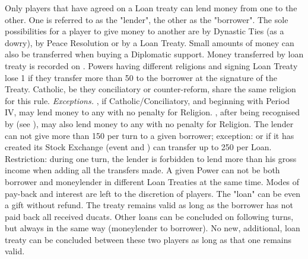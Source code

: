 \label{chDiplo:Alliance:Loan Treaty}
Only players that have agreed on a Loan treaty can lend money from one to the
other. One is referred to as the "lender", the other as the "borrower".
\bparag The sole possibilities for a player to give money to another are by
Dynastic Ties (as a dowry), by Peace Resolution or by a Loan Treaty. Small
amounts of money can also be transferred %
when buying a Diplomatic support.
\bparag Money transferred by loan treaty is recorded on .
\bparag Powers having different religions and signing Loan Treaty lose 1 \STAB
if they transfer more than 50 \ducats to the borrower at the signature of the
Treaty. Catholic, be they conciliatory or counter-reform, share the same
religion for this rule.
\bparag \textit{Exceptions.} \FRA, if Catholic/Conciliatory, and \ENG
beginning with Period IV, may lend money to any \MAJ with no penalty for
Religion. \HOL, after being recognised by \SPA (see ), may also lend money to any \MAJ with no penalty for Religion.
\bparag The lender can not give more than 150 \ducats per turn to a given
borrower; %
exception: \HOL or \ENG if it has created its Stock Exchange (event
 and ) can transfer up to 250 \ducats per Loan.
\bparag Restriction: during one turn, the lender is forbidden to lend more
than his gross income when adding all the transfers made.
\bparag A given Power can not be both borrower and moneylender in different
Loan Treaties at the same time.
\bparag Modes of pay-back and interest are left to the discretion of
players. The "loan" can be even a gift without refund.
\bparag The treaty remains valid as long as the borrower has not paid back all
received ducats. Other loans can be concluded on following turns, but always
in the same way (moneylender to borrower). No new, additional, loan treaty can
be concluded between these two players as long as that one remains valid.
